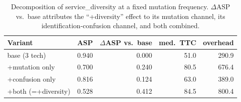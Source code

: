 \begin{table}[t]
\centering
\caption{Decomposition of service\_diversity at a fixed mutation frequency. $\Delta$ASP vs.\ base attributes the ``+diversity'' effect to its mutation channel, its identification-confusion channel, and both combined.}
\label{tab:diversity_decomposition}
\begin{tabular}{lrrrr}
\toprule
Variant & ASP & $\Delta$ASP vs.\ base & med.\ TTC & overhead \\
\midrule
base (3 tech) & 0.940 & 0.000 & 51.0 & 290.9 \\
+mutation only & 0.700 & 0.240 & 80.5 & 676.4 \\
+confusion only & 0.816 & 0.124 & 63.0 & 389.0 \\
+both (=+diversity) & 0.528 & 0.412 & 84.5 & 800.4 \\
\bottomrule
\end{tabular}
\end{table}
